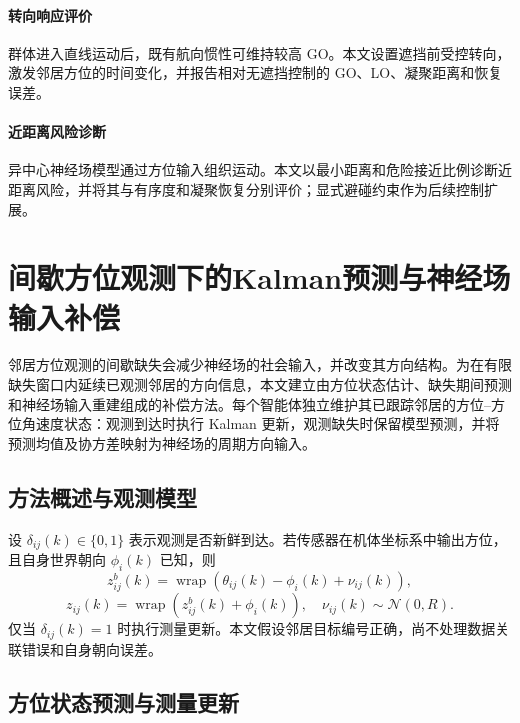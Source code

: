 \documentclass[UTF8,fontset=windows,11pt]{ctexart}
\begin{document}
\paragraph{转向响应评价}
群体进入直线运动后，既有航向惯性可维持较高 GO。本文设置遮挡前受控转向，激发邻居方位的时间变化，并报告相对无遮挡控制的 GO、LO、凝聚距离和恢复误差。

\paragraph{近距离风险诊断}
异中心神经场模型通过方位输入组织运动。本文以最小距离和危险接近比例诊断近距离风险，并将其与有序度和凝聚恢复分别评价；显式避碰约束作为后续控制扩展。

\section{间歇方位观测下的Kalman预测与神经场输入补偿}

邻居方位观测的间歇缺失会减少神经场的社会输入，并改变其方向结构。为在有限缺失窗口内延续已观测邻居的方向信息，本文建立由方位状态估计、缺失期间预测和神经场输入重建组成的补偿方法。每个智能体独立维护其已跟踪邻居的方位--方位角速度状态：观测到达时执行 Kalman 更新，观测缺失时保留模型预测，并将预测均值及协方差映射为神经场的周期方向输入。

\subsection{方法概述与观测模型}
设 $\delta_{ij}(k)\in\{0,1\}$ 表示观测是否新鲜到达。若传感器在机体坐标系中输出方位，且自身世界朝向 $\phi_i(k)$ 已知，则
\begin{equation}
 z^b_{ij}(k)=\operatorname{wrap}(\theta_{ij}(k)-\phi_i(k)+\nu_{ij}(k)),
\end{equation}
\begin{equation}
 z_{ij}(k)=\operatorname{wrap}(z^b_{ij}(k)+\phi_i(k)),
 \quad \nu_{ij}(k)\sim\mathcal N(0,R).
\end{equation}
仅当 $\delta_{ij}(k)=1$ 时执行测量更新。本文假设邻居目标编号正确，尚不处理数据关联错误和自身朝向误差。

\subsection{方位状态预测与测量更新}
\end{document}
